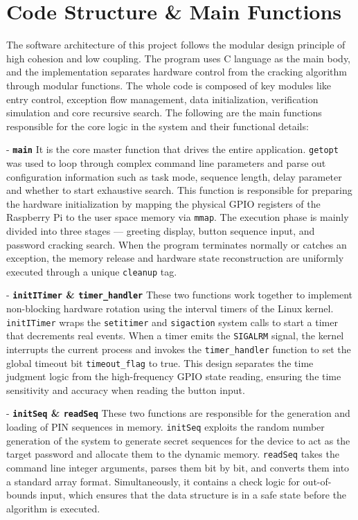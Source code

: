 \section{Code Structure \& Main Functions}
\label{sec:software_design}

The software architecture of this project follows the modular design principle of high cohesion and low coupling. The program uses C language as the main body, and the implementation separates hardware control from the cracking algorithm through modular functions. The whole code is composed of key modules like entry control, exception flow management, data initialization, verification simulation and core recursive search. The following are the main functions responsible for the core logic in the system and their functional details:

- \noindent \textbf{\texttt{main}} It is the core master function that drives the entire application. \texttt{getopt} was used to loop through complex command line parameters and parse out configuration information such as task mode, sequence length, delay parameter and whether to start exhaustive search. This function is responsible for preparing the hardware initialization by mapping the physical GPIO registers of the Raspberry Pi to the user space memory via \texttt{mmap}. The execution phase is mainly divided into three stages --- greeting display, button sequence input, and password cracking search. When the program terminates normally or catches an exception, the memory release and hardware state reconstruction are uniformly executed through a unique \texttt{cleanup} tag.

- \noindent \textbf{\texttt{initITimer} \& \texttt{timer\_handler}} These two functions work together to implement non-blocking hardware rotation using the interval timers of the Linux kernel. \texttt{initITimer} wraps the \texttt{setitimer} and \texttt{sigaction} system calls to start a timer that decrements real events. When a timer emits the \texttt{SIGALRM} signal, the kernel interrupts the current process and invokes the \texttt{timer\_handler} function to set the global timeout bit \texttt{timeout\_flag} to true. This design separates the time judgment logic from the high-frequency GPIO state reading, ensuring the time sensitivity and accuracy when reading the button input.

- \noindent \textbf{\texttt{initSeq} \& \texttt{readSeq}} These two functions are responsible for the generation and loading of PIN sequences in memory. \texttt{initSeq} exploits the random number generation of the system to generate secret sequences for the device to act as the target password and allocate them to the dynamic memory. \texttt{readSeq} takes the command line integer arguments, parses them bit by bit, and converts them into a standard array format. Simultaneously, it contains a check logic for out-of-bounds input, which ensures that the data structure is in a safe state before the algorithm is executed.

